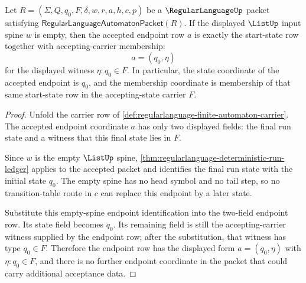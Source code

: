 \begin{theorem}
\label{thm:regularlanguage-empty-word-acceptance-exactness}
Let $R=(\Sigma,Q,q_0,F,\delta,w,r,a,h,c,p)$ be a $\RegularLanguageUp$ packet satisfying
$\mathsf{RegularLanguageAutomatonPacket}(R)$. If the displayed $\ListUp$ input spine $w$ is empty, then the accepted endpoint row $a$ is exactly the start-state row together with accepting-carrier membership:
$$
a=(q_0,\eta)
$$
for the displayed witness $\eta:q_0\in F$. In particular, the state coordinate of the accepted endpoint is $q_0$, and the membership coordinate is membership of that same start-state row in the accepting-state carrier $F$.
\end{theorem}
\begin{proof}
Unfold the carrier row of \autoref{def:regularlanguage-finite-automaton-carrier}. The accepted endpoint coordinate $a$ has only two displayed fields: the final run state and a witness that this final state lies in $F$.

Since $w$ is the empty $\ListUp$ spine, \autoref{thm:regularlanguage-deterministic-run-ledger} applies to the accepted packet and identifies the final run state with the initial state $q_0$. The empty spine has no head symbol and no tail step, so no transition-table route in $c$ can replace this endpoint by a later state.

Substitute this empty-spine endpoint identification into the two-field endpoint row. Its state field becomes $q_0$. Its remaining field is still the accepting-carrier witness supplied by the endpoint row; after the substitution, that witness has type $q_0\in F$. Therefore the endpoint row has the displayed form $a=(q_0,\eta)$ with $\eta:q_0\in F$, and there is no further endpoint coordinate in the packet that could carry additional acceptance data.
\end{proof}

